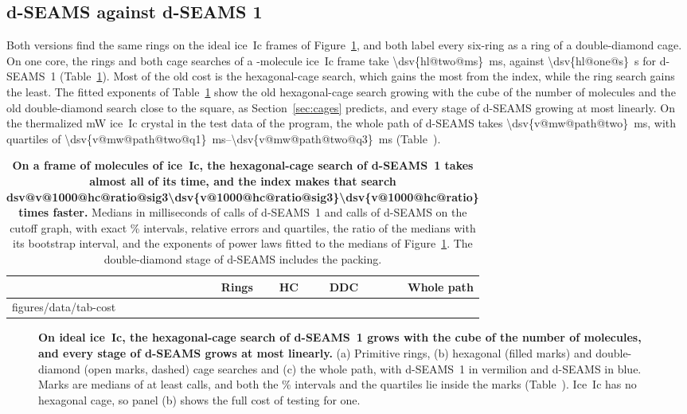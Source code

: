\documentclass[preprint,12pt]{elsarticle}
\makeatletter
\newcommand{\rthree}[1]{\ifcsname dsv@#1@sig3\endcsname\num{\dsv{#1@sig3}}\else\num[round-mode=figures,round-precision=3]{\dsv{#1}}\fi}
\newcommand{\tabbody}[1]{\@@input #1 }
\makeatother
\begin{document}
\subsection{d-SEAMS against d-SEAMS 1}
\label{sec:versions}

Both versions find the same rings on the ideal ice~Ic frames of Figure~\ref{fig:versions}, and both label every six-ring as a ring of a double-diamond cage.
On one core, the rings and both cage searches of a -molecule ice~Ic frame take \qty{\dsv{hl@two@ms}}{\milli\second}, against \qty{\dsv{hl@one@s}}{\second} for d-SEAMS~1 (Table~\ref{tab:cost}).
Most of the old cost is the hexagonal-cage search, which gains the most from the index, while the ring search gains the least.
The fitted exponents of Table~\ref{tab:cost} show the old hexagonal-cage search growing with the cube of the number of molecules and the old double-diamond search close to the square, as Section~\ref{sec:cages} predicts, and every stage of d-SEAMS growing at most linearly.
On the thermalized mW ice~Ic crystal in the test data of the program, the whole path of d-SEAMS takes \qty{\dsv{v@mw@path@two}}{\milli\second}, with quartiles of \qtyrange{\dsv{v@mw@path@two@q1}}{\dsv{v@mw@path@two@q3}}{\milli\second} (Table~).

\begin{table}[tbp]
\centering
\caption{\textbf{On a frame of  molecules of ice~Ic, the hexagonal-cage search of d-SEAMS~1 takes almost all of its time, and the index makes that search \rthree{v@1000@hc@ratio} times faster.}
Medians in milliseconds of  calls of d-SEAMS~1 and  calls of d-SEAMS on the cutoff graph, with exact \% intervals, relative errors and quartiles, the ratio of the medians with its bootstrap interval, and the exponents of power laws fitted to the medians of Figure~\ref{fig:versions}.
The double-diamond stage of d-SEAMS includes the packing.}
\label{tab:cost}
\footnotesize
\setlength{\tabcolsep}{3pt}
\begin{tabular}{@{}llrrrr@{}}
\toprule
 & & Rings & HC & DDC & Whole path \\
\midrule
\tabbody{figures/data/tab-cost}
\bottomrule
\end{tabular}
\end{table}

\begin{figure}[tbp]
\centering

\caption{\textbf{On ideal ice~Ic, the hexagonal-cage search of d-SEAMS~1 grows with the cube of the number of molecules, and every stage of d-SEAMS grows at most linearly.}
(a) Primitive rings, (b) hexagonal (filled marks) and double-diamond (open marks, dashed) cage searches and (c) the whole path, with d-SEAMS~1 in vermilion and d-SEAMS in blue.
Marks are medians of at least  calls, and both the \% intervals and the quartiles lie inside the marks (Table~).
Ice~Ic has no hexagonal cage, so panel (b) shows the full cost of testing for one.}
\label{fig:versions}
\end{figure}
\end{document}
